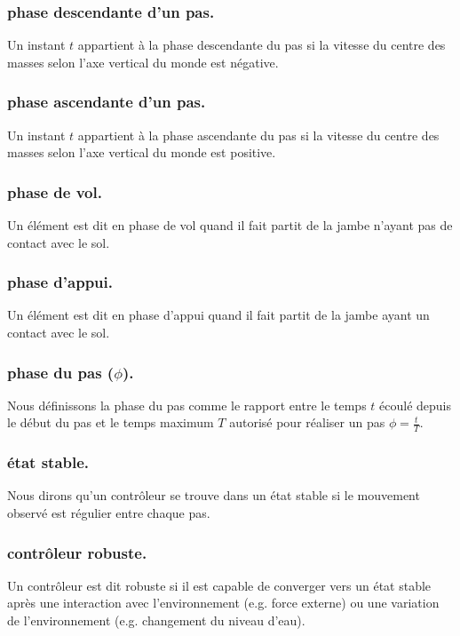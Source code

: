 \documentclass[runningheads,a4paper]{llncs}
\begin{document}
\subsubsection{phase descendante d'un pas.} Un instant $t$ appartient à la phase descendante du pas si la vitesse du centre des masses selon l'axe vertical du monde est négative.

\subsubsection{phase ascendante d'un pas.} Un instant $t$ appartient à la phase ascendante du pas si la vitesse du centre des masses selon l'axe vertical du monde est positive.

\subsubsection{phase de vol.} Un élément est dit en phase de vol quand il fait partit de la jambe n'ayant pas de contact avec le sol.

\subsubsection{phase d'appui.} Un élément est dit en phase d'appui quand il fait partit de la jambe ayant un contact avec le sol.

\subsubsection{phase du pas ($\phi$).} Nous définissons la phase du pas comme le rapport entre le temps $t$ écoulé depuis le début du pas et le temps maximum $T$ autorisé pour réaliser un pas $\phi=\frac{t}{T}$.

\subsubsection{état stable.} Nous dirons qu'un contrôleur se trouve dans un état stable si le mouvement observé est régulier entre chaque pas.

\subsubsection{contrôleur robuste.} Un contrôleur est dit robuste si il est capable de converger vers un état stable après une interaction avec l'environnement (e.g. force externe) ou une variation de l'environnement (e.g. changement du niveau d'eau).
\end{document}
